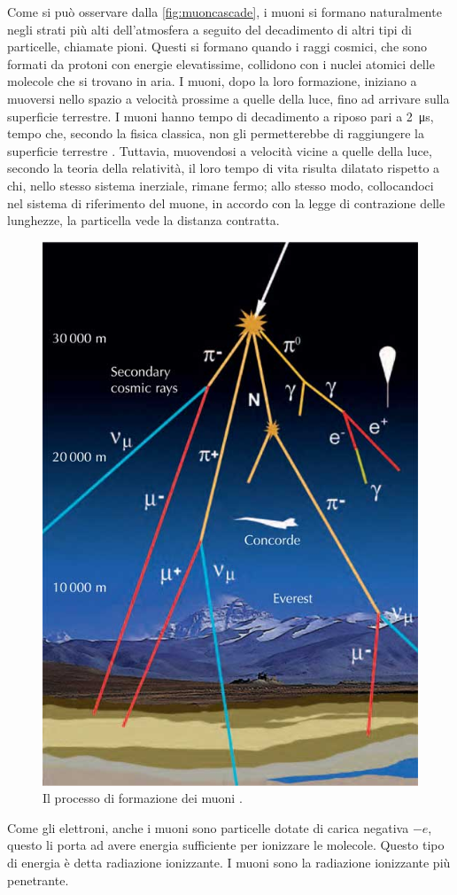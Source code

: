 Come si può osservare dalla \autoref*{fig:muoncascade}, i muoni si formano naturalmente negli strati più alti dell'atmosfera a seguito del
decadimento di altri tipi di particelle, chiamate pioni. Questi si formano quando i raggi cosmici, che sono formati da protoni con energie
elevatissime, collidono con i nuclei atomici delle molecole che si trovano in aria.
I muoni, dopo la loro formazione, iniziano a muoversi nello spazio a velocità prossime a quelle della luce, fino ad arrivare sulla superficie
terrestre. I muoni hanno tempo di decadimento a riposo pari a \SI{2}{\micro\second}, tempo che, secondo la fisica classica, non gli
permetterebbe di raggiungere la superficie terrestre \cite{muonsources_about}. Tuttavia, muovendosi a velocità vicine a quelle della luce, secondo la teoria della
relatività, il loro tempo di vita risulta dilatato rispetto a chi, nello stesso sistema inerziale, rimane fermo; allo stesso modo, collocandoci
nel sistema di riferimento del muone, in accordo con la legge di contrazione delle lunghezze, la particella vede la distanza contratta.
\begin{figure}[h!]
    \centering
    \includegraphics[width=.65\linewidth]{img/muoncascade.jpg}
    \caption{Il processo di formazione dei muoni \cite{luu_2020_decode}.}
    \label{fig:muoncascade}
\end{figure}

Come gli elettroni, anche i muoni sono particelle dotate di carica negativa $-e$, questo li porta ad avere energia sufficiente per
ionizzare le molecole. Questo tipo di energia è detta radiazione ionizzante. I muoni sono la radiazione ionizzante più penetrante.
